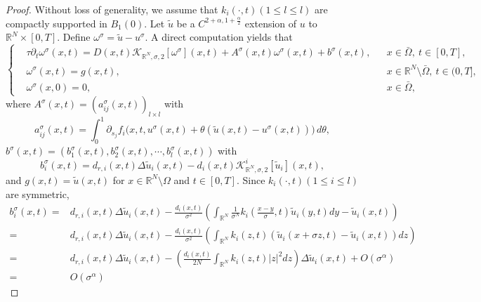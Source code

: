 \documentclass[11pt,reqno]{amsart}
\numberwithin{equation}{section}
\begin{document}
\begin{proof}
Without loss of generality, we assume that $k_{i}(\cdot,t)(1 \leq l \leq l)$ are compactly supported in $B_{1}(0)$.
Let $\tilde{u}$ be a $C^{2+\alpha,1+\frac{\alpha}{2}}$ extension of $u$ to $\mathbb{R}^{N}\times[0,T]$.
Define $\omega^{\sigma}= \tilde{u}- u^{\sigma}$.
A direct computation yields that
\begin{equation}\label{3-7}
\left\{
\begin{aligned}
&\tau\partial_t\omega^\sigma(x,t)
= D(x,t)\mathcal{K}_{\mathbb{R}^N,\sigma,2}[\omega^\sigma](x,t)
+ A^\sigma(x,t)\omega^\sigma(x,t) + b^\sigma(x,t),
&& x\in\bar\Omega,\ t\in[0,T],\\
&\omega^\sigma(x,t)=g(x,t), && x\in\mathbb{R}^N\setminus\bar\Omega,\ t\in(0,T],\\
&\omega^\sigma(x,0)=0, && x\in\bar\Omega,
\end{aligned}
\right.
\end{equation}
where $A^\sigma(x,t)=(a_{ij}^\sigma(x,t))_{l\times l}$ with
\begin{equation*}
a_{ij}^\sigma(x,t)=\int_0^1 \partial_{s_j}f_i\bigl(x,t,u^\sigma(x,t)+\theta(\tilde u(x,t)-u^\sigma(x,t))\bigr)\,d\theta,
\end{equation*}
$b^{\sigma}(x,t) = \left(b_{1}^{\sigma}(x,t), b_{2}^{\sigma}(x,t) , \cdots, b_{l}^{\sigma}(x,t) \right)$ with
\begin{equation*}
b_{i}^{\sigma}(x,t)=d_{r,i}(x,t)\Delta \tilde{u}_{i}(x,t) -d_{i}(x,t)\mathcal{K}^{i}_{\mathbb{R}^{N},\sigma,2}[\tilde{u}_{i}](x,t),
\end{equation*}
and
$g(x,t)=\tilde{u}(x,t)$ for $x\in \mathbb{R}^{N}\setminus\Omega $ and $t\in [0,T]$.
%
%
Since $k_{i}(\cdot,t) (1\leq i \leq l) $ are symmetric,
\begin{align*}
b_{i}^{\sigma}(x,t)
=&d_{r,i}(x,t)\Delta \tilde{u}_{i}(x,t) - \frac{d_{i}(x,t)}{\sigma^{2}}
\left( \int_{\mathbb{R}^{N}} \frac{1}{\sigma^{N}}k_{i}\left(\frac{x-y}{\sigma},t\right)\tilde{u}_{i}(y,t)dy-\tilde{u}_{i}(x,t) \right)
\\
=& d_{r,i}(x,t)\Delta \tilde{u}_{i}(x,t) - \frac{d_{i}(x,t)}{\sigma^{2}}\left(\int_{\mathbb{R}^{N}}k_{i}(z,t)\left(\tilde{u}_{i}(x+\sigma z,t)-\tilde{u}_{i}(x,t)\right)dz \right)
\\
=& d_{r,i}(x,t)\Delta \tilde{u}_{i}(x,t) -   \left(\frac{d_{i}(x,t)}{2N}\int_{\mathbb{R}^{N}}k_{i}(z,t)|z|^{2}dz\right) \Delta \tilde{u}_{i}(x,t)+O(\sigma^{\alpha})
\\
=&O(\sigma^{\alpha})
\end{align*}

\end{proof}
\end{document}
